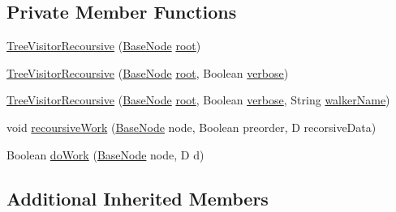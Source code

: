 \subsection*{Private Member Functions}
\begin{DoxyCompactItemize}
\item 
\hyperlink{classit_1_1emarolab_1_1cagg_1_1core_1_1BaseNode_1_1TreeVisitorRecoursive_3_01D_01extends_01Object_01_4_af913cc93bebe8a52823d2cfb22bdb019}{Tree\-Visitor\-Recoursive} (\hyperlink{classit_1_1emarolab_1_1cagg_1_1core_1_1BaseNode}{Base\-Node} \hyperlink{classit_1_1emarolab_1_1cagg_1_1core_1_1BaseNode_1_1TreeVisitor_ac31e11edac71abb866fd7d113a2bb017}{root})
\item 
\hyperlink{classit_1_1emarolab_1_1cagg_1_1core_1_1BaseNode_1_1TreeVisitorRecoursive_3_01D_01extends_01Object_01_4_a5ae7dc53caf438e5018f31c4d449cafe}{Tree\-Visitor\-Recoursive} (\hyperlink{classit_1_1emarolab_1_1cagg_1_1core_1_1BaseNode}{Base\-Node} \hyperlink{classit_1_1emarolab_1_1cagg_1_1core_1_1BaseNode_1_1TreeVisitor_ac31e11edac71abb866fd7d113a2bb017}{root}, Boolean \hyperlink{classit_1_1emarolab_1_1cagg_1_1core_1_1BaseNode_1_1TreeVisitor_a08821e56497abdbac48f874f8946b335}{verbose})
\item 
\hyperlink{classit_1_1emarolab_1_1cagg_1_1core_1_1BaseNode_1_1TreeVisitorRecoursive_3_01D_01extends_01Object_01_4_a0bfae431ebbd6efb2d4c1145c0a946d5}{Tree\-Visitor\-Recoursive} (\hyperlink{classit_1_1emarolab_1_1cagg_1_1core_1_1BaseNode}{Base\-Node} \hyperlink{classit_1_1emarolab_1_1cagg_1_1core_1_1BaseNode_1_1TreeVisitor_ac31e11edac71abb866fd7d113a2bb017}{root}, Boolean \hyperlink{classit_1_1emarolab_1_1cagg_1_1core_1_1BaseNode_1_1TreeVisitor_a08821e56497abdbac48f874f8946b335}{verbose}, String \hyperlink{classit_1_1emarolab_1_1cagg_1_1core_1_1BaseNode_1_1TreeVisitor_aa7178eb73b988619412baf1d4f97b703}{walker\-Name})
\item 
void \hyperlink{classit_1_1emarolab_1_1cagg_1_1core_1_1BaseNode_1_1TreeVisitorRecoursive_3_01D_01extends_01Object_01_4_ae0da6412c68cd533c72989a2854137b9}{recoursive\-Work} (\hyperlink{classit_1_1emarolab_1_1cagg_1_1core_1_1BaseNode}{Base\-Node} node, Boolean preorder, D recorsive\-Data)
\item 
Boolean \hyperlink{classit_1_1emarolab_1_1cagg_1_1core_1_1BaseNode_1_1TreeVisitorRecoursive_3_01D_01extends_01Object_01_4_a77dcd78927521b0f971aced7e7013b27}{do\-Work} (\hyperlink{classit_1_1emarolab_1_1cagg_1_1core_1_1BaseNode}{Base\-Node} node, D d)
\end{DoxyCompactItemize}
\subsection*{Additional Inherited Members}


